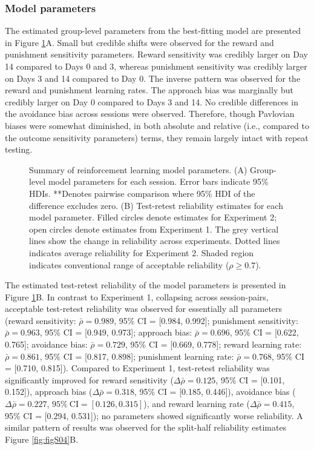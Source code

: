 \documentclass[a4paper,12pt]{article}
\begin{document}
\begin{refsection}[main]
\subsubsection*{Model parameters}

The estimated group-level parameters from the best-fitting model are presented in Figure \ref{fig:exp02_modeling}A. Small but credible shifts were observed for the reward and punishment sensitivity parameters. Reward sensitivity was credibly larger on Day 14 compared to Days 0 and 3, whereas punishment sensitivity was credibly larger on Days 3 and 14 compared to Day 0. The inverse pattern was observed for the reward and punishment learning rates. The approach bias was marginally but credibly larger on Day 0 compared to Days 3 and 14. No credible differences in the avoidance bias across sessions were observed. Therefore, though Pavlovian biases were somewhat diminished, in both absolute and relative (i.e., compared to the outcome sensitivity parameters) terms, they remain largely intact with repeat testing.   

\begin{figure}[t!]
    \centerline{}
    \caption{Summary of reinforcement learning model parameters. (A) Group-level model parameters for each session. Error bars indicate 95\% HDIs. **Denotes pairwise comparison where 95\% HDI of the difference excludes zero. (B) Test-retest reliability estimates for each model parameter. Filled circles denote estimates for Experiment 2; open circles denote estimates from Experiment 1. The grey vertical lines show the change in reliability across experiments. Dotted lines indicates average reliability for Experiment 2. Shaded region indicates conventional range of acceptable reliability ($\rho \geq 0.7$).}
    \label{fig:exp02_modeling}
\end{figure}

The estimated test-retest reliability of the model parameters is presented in Figure \ref{fig:exp02_modeling}B. In contrast to Experiment 1, collapsing across session-pairs, acceptable test-retest reliability was observed for essentially all parameters (reward sensitivity: $\bar{\rho} = 0.989$, 95\% CI = [0.984, 0.992]; punishment sensitivity: $\bar{\rho} = 0.963$, 95\% CI = [0.949, 0.973]; approach bias: $\bar{\rho} = 0.696$, 95\% CI = [0.622, 0.765]; avoidance bias: $\bar{\rho} = 0.729$, 95\% CI = [0.669, 0.778]; reward learning rate: $\bar{\rho} = 0.861$, 95\% CI = [0.817, 0.898]; punishment learning rate: $\bar{\rho} = 0.768$, 95\% CI = [0.710, 0.815]). Compared to Experiment 1, test-retest reliability was significantly improved for reward sensitivity ($\Delta\bar{\rho} = 0.125$, 95\% CI = [0.101, 0.152]), approach bias ($\Delta\bar{\rho} = 0.318$, 95\% CI = [0.185, 0.446]), avoidance bias ($\Delta\bar{\rho} = 0.227$, $95\% \ \text{CI} = [0.126, 0.315]$), and reward learning rate ($\Delta\bar{\rho} = 0.415$, 95\% CI = [0.294, 0.531]); no parameters showed significantly worse reliability. A similar pattern of results was observed for the split-half reliability estimates Figure \ref{fig:figS04}B.


\end{refsection}
\end{document}
